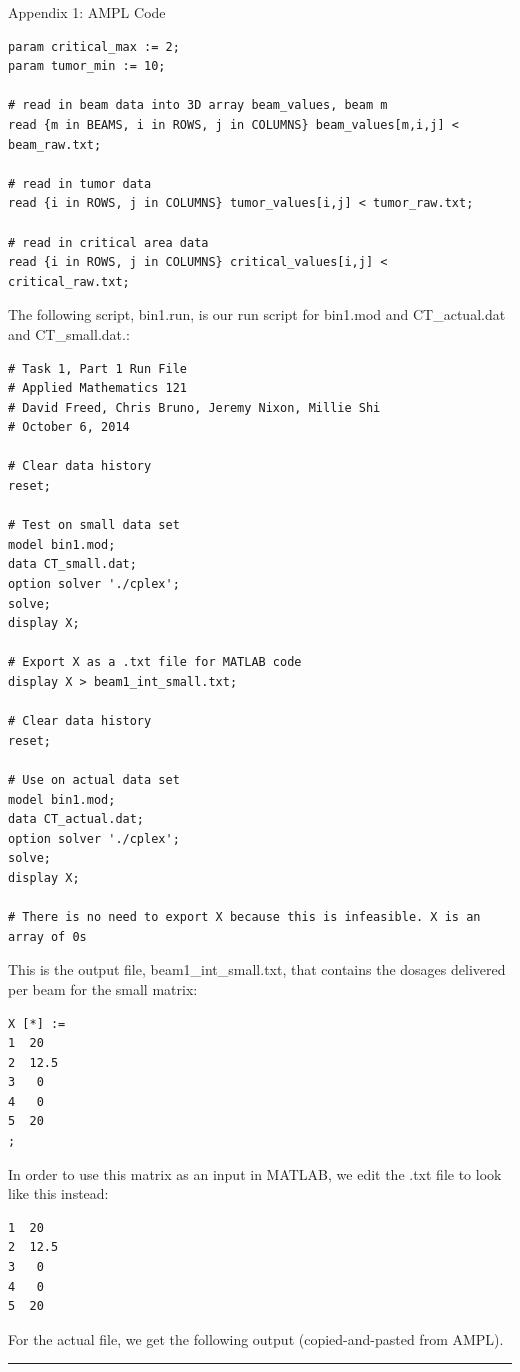 \documentclass[12pt]{article}
\makeatletter
\newenvironment{task}{\@startsection
       {section}{1}
       {0.4em}{-.5ex plus -1ex minus -.2ex}{.5ex plus .2ex}
       {\pagebreak[3]\large\bf\noindent{Task}}}
       {\nopagebreak[3]\vspace{3ex}\begin{center}\rule{1\linewidth}{.3pt}\end{center}}
\makeatother
\begin{document}
\begin{task}{Appendix 1: AMPL Code}
\begin{enumerate}
\begin{lstlisting}
param critical_max := 2;
param tumor_min := 10;

# read in beam data into 3D array beam_values, beam m
read {m in BEAMS, i in ROWS, j in COLUMNS} beam_values[m,i,j] < beam_raw.txt;

# read in tumor data
read {i in ROWS, j in COLUMNS} tumor_values[i,j] < tumor_raw.txt;

# read in critical area data
read {i in ROWS, j in COLUMNS} critical_values[i,j] < critical_raw.txt;
\end{lstlisting}

The following script, bin1.run, is our run script for bin1.mod and CT\_actual.dat and CT\_small.dat.:
\begin{lstlisting}
# Task 1, Part 1 Run File
# Applied Mathematics 121
# David Freed, Chris Bruno, Jeremy Nixon, Millie Shi
# October 6, 2014

# Clear data history
reset;

# Test on small data set
model bin1.mod;
data CT_small.dat;
option solver './cplex';
solve;
display X;

# Export X as a .txt file for MATLAB code
display X > beam1_int_small.txt;

# Clear data history
reset;

# Use on actual data set
model bin1.mod;
data CT_actual.dat;
option solver './cplex';
solve;
display X;

# There is no need to export X because this is infeasible. X is an array of 0s

\end{lstlisting}

This is the output file, beam1\_int\_small.txt, that contains the dosages delivered per beam for the small matrix:

\begin{lstlisting}
X [*] :=
1  20
2  12.5
3   0
4   0
5  20
;
\end{lstlisting}

In order to use this matrix as an input in MATLAB, we edit the .txt file to look like this instead:
\begin{lstlisting}
1  20
2  12.5
3   0
4   0
5  20
\end{lstlisting}

For the actual file, we get the following output (copied-and-pasted from AMPL).


\end{enumerate}
\end{task}
\end{document}
